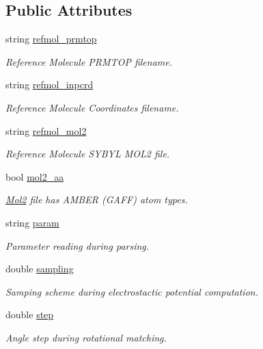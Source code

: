 \subsection*{Public Attributes}
\begin{DoxyCompactItemize}
\item 
string \hyperlink{classParser_a260001029b62071b57edd6c8e66ca02f}{refmol\_\-prmtop}
\begin{DoxyCompactList}\small\item\em Reference Molecule PRMTOP filename. \end{DoxyCompactList}\item 
string \hyperlink{classParser_a74975ac5ab6c59e6d67ea5319590271e}{refmol\_\-inpcrd}
\begin{DoxyCompactList}\small\item\em Reference Molecule Coordinates filename. \end{DoxyCompactList}\item 
string \hyperlink{classParser_a92f17b5998dfe205b33c1713f5a16ab8}{refmol\_\-mol2}
\begin{DoxyCompactList}\small\item\em Reference Molecule SYBYL MOL2 file. \end{DoxyCompactList}\item 
bool \hyperlink{classParser_a8db5c5682da4ecd746f4e73594955b09}{mol2\_\-aa}
\begin{DoxyCompactList}\small\item\em \hyperlink{classMol2}{Mol2} file has AMBER (GAFF) atom types. \end{DoxyCompactList}\item 
string \hyperlink{classParser_a52d2639511cc6ae75cb7e26b3a632169}{param}
\begin{DoxyCompactList}\small\item\em Parameter reading during parsing. \end{DoxyCompactList}\item 
double \hyperlink{classParser_a0acd57af169e5e9bdcc891ece8336b67}{sampling}
\begin{DoxyCompactList}\small\item\em Samping scheme during electrostactic potential computation. \end{DoxyCompactList}\item 
double \hyperlink{classParser_a9779ee1f5fc41336fe3628451d8dbe15}{step}
\begin{DoxyCompactList}\small\item\em Angle step during rotational matching. \end{DoxyCompactList}\item 

\end{DoxyCompactItemize}
